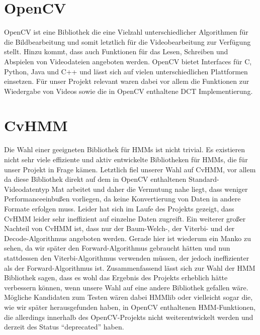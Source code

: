 \section{OpenCV}
OpenCV ist eine Bibliothek die eine Vielzahl unterschiedlicher Algorithmen für die Bildbearbeitung und somit letztlich für die Videobearbeitung zur Verfügung stellt. Hinzu kommt, dass auch Funktionen für das Lesen, Schreiben und Abspielen von Videodateien angeboten werden.
OpenCV bietet Interfaces für C, Python, Java und C++ und lässt sich auf vielen unterschiedlichen Plattformen einsetzen. Für unser Projekt relevant waren dabei vor allem die Funktionen zur Wiedergabe von Videos sowie die in OpenCV enthaltene DCT Implementierung.

\section{CvHMM}
Die Wahl einer geeigneten Bibliothek für HMMs ist nicht trivial. Es existieren nicht sehr viele effiziente und aktiv entwickelte Bibliotheken für HMMs, die für unser Projekt in Frage kämen.
Letztlich fiel unserer Wahl auf CvHMM, vor allem da diese Bibliothek direkt auf dem in OpenCV enthaltenen Standard-Videodatentyp Mat arbeitet und daher die Vermutung nahe liegt, dass weniger Performanceeinbußen vorliegen, da keine Konvertierung von Daten in andere Formate erfolgen muss.
Leider hat sich im Laufe des Projekts gezeigt, dass CvHMM leider sehr ineffizient auf einzelne Daten zugreift.
Ein weiterer großer Nachteil von CvHMM ist, dass nur der Baum-Welch-, der Viterbi- und der Decode-Algorithmus angeboten werden. Gerade hier ist wiederum ein Manko zu sehen, da wir später den Forward-Algorithmus gebraucht hätten und nun stattdessen den Viterbi-Algorithmus verwenden müssen, der jedoch ineffizienter als der Forward-Algorithmus ist.
Zusammenfassend lässt sich zur Wahl der HMM Bibliothek sagen, dass es wohl das Ergebnis des Projekts erheblich hätte verbessern können, wenn unsere Wahl auf eine andere Bibliothek gefallen wäre.
Mögliche Kandidaten zum Testen wären dabei HMMlib oder vielleicht sogar die, wie wir später herausgefunden haben, in OpenCV enthaltenen HMM-Funktionen, die allerdings innerhalb des OpenCV-Projekts nicht weiterentwickelt werden und derzeit des Status “deprecated” haben.


